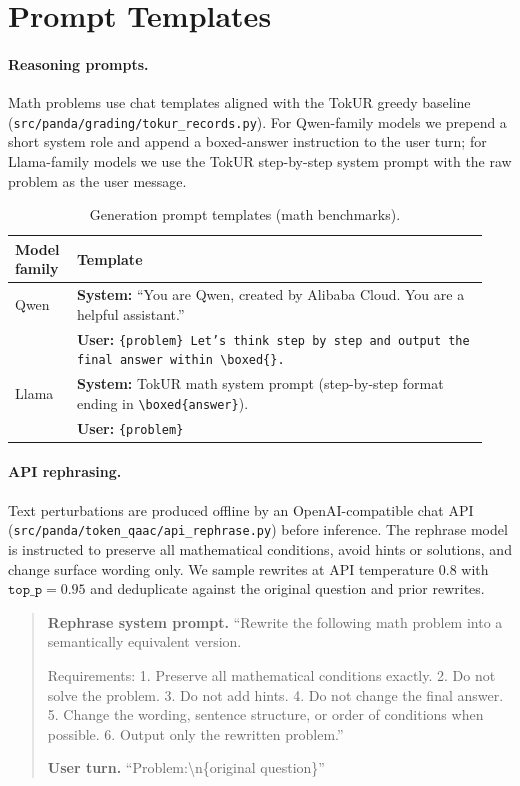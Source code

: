 \documentclass{article} %
\begin{document}
\section{Prompt Templates}
\label{app:prompts}

\paragraph{Reasoning prompts.}
Math problems use chat templates aligned with the TokUR greedy baseline (\texttt{src/panda/grading/tokur\_records.py}).
For Qwen-family models we prepend a short system role and append a boxed-answer instruction to the user turn; for Llama-family models we use the TokUR step-by-step system prompt with the raw problem as the user message.

\begin{table}[t]
  \centering
  \small
  \caption{Generation prompt templates (math benchmarks).}
  \label{tab:prompt-templates}
  \begin{tabular}{p{0.12\linewidth}p{0.82\linewidth}}
    \toprule
    Model family & Template \\
    \midrule
    Qwen &
    \textbf{System:} ``You are Qwen, created by Alibaba Cloud. You are a helpful assistant.''\\
    &
    \textbf{User:} \texttt{\{problem\} Let's think step by step and output the final answer within \textbackslash boxed\{\}.} \\
    \addlinespace
    Llama &
    \textbf{System:} TokUR math system prompt (step-by-step format ending in \verb|\boxed{answer}|).\\
    &
    \textbf{User:} \texttt{\{problem\}} \\
    \bottomrule
  \end{tabular}
\end{table}

\paragraph{API rephrasing.}
Text perturbations are produced offline by an OpenAI-compatible chat API (\texttt{src/panda/token\_qaac/api\_rephrase.py}) before inference.
The rephrase model is instructed to preserve all mathematical conditions, avoid hints or solutions, and change surface wording only.
We sample rewrites at API temperature $0.8$ with $\texttt{top\_p}{=}0.95$ and deduplicate against the original question and prior rewrites.

\begin{quote}
\small
\textbf{Rephrase system prompt.} ``Rewrite the following math problem into a semantically equivalent version.

Requirements:
1. Preserve all mathematical conditions exactly.
2. Do not solve the problem.
3. Do not add hints.
4. Do not change the final answer.
5. Change the wording, sentence structure, or order of conditions when possible.
6. Output only the rewritten problem.''

\textbf{User turn.} ``Problem:\textbackslash n\{original question\}''
\end{quote}
\end{document}
